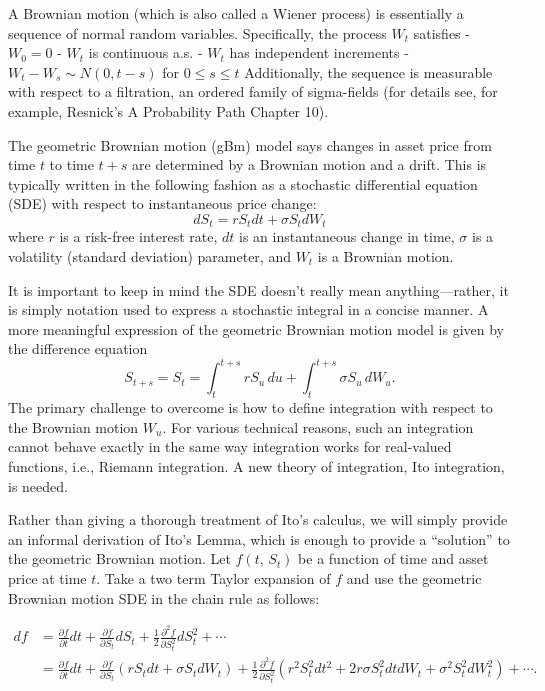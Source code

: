 \documentclass[
]{book}
\begin{document}
A Brownian motion (which is also called a Wiener process) is essentially a sequence of normal random variables. Specifically, the process \(W_t\) satisfies
- \(W_0 = 0\)
- \(W_t\) is continuous a.s.
- \(W_t\) has independent increments
- \(W_t - W_s \sim N(0,t-s)\) for \(0\leq s\leq t\)
Additionally, the sequence is measurable with respect to a filtration, an ordered family of sigma-fields (for details see, for example, Resnick's A Probability Path Chapter 10).

The geometric Brownian motion (gBm) model says changes in asset price from time \(t\) to time \(t+s\) are determined by a Brownian motion and a drift. This is typically written in the following fashion as a stochastic differential equation (SDE) with respect to instantaneous price change:
\[dS_t = rS_tdt + \sigma S_t dW_t\]
where \(r\) is a risk-free interest rate, \(dt\) is an instantaneous change in time, \(\sigma\) is a volatility (standard deviation) parameter, and \(W_t\) is a Brownian motion.

It is important to keep in mind the SDE doesn't really mean anything---rather, it is simply notation used to express a stochastic integral in a concise manner. A more meaningful expression of the geometric Brownian motion model is given by the difference equation
\[S_{t+s} = S_t = \int_t^{t+s} rS_u\,du + \int_{t}^{t+s} \sigma S_u \, dW_u.\]
The primary challenge to overcome is how to define integration with respect to the Brownian motion \(W_u\). For various technical reasons, such an integration cannot behave exactly in the same way integration works for real-valued functions, i.e., Riemann integration. A new theory of integration, Ito integration, is needed.

Rather than giving a thorough treatment of Ito's calculus, we will simply provide an informal derivation of Ito's Lemma, which is enough to provide a ``solution'' to the geometric Brownian motion. Let \(f(t,\,S_t)\) be a function of time and asset price at time \(t\). Take a two term Taylor expansion of \(f\) and use the geometric Brownian motion SDE in the chain rule as follows:

\begin{align*}
df &= \frac{\partial f}{\partial t}dt + \frac{\partial f}{\partial S_t}dS_t + \frac{1}{2}\frac{\partial^2 f}{\partial S_t^2}dS_t^2 + \cdots\\
& = \frac{\partial f}{\partial t}dt + \frac{\partial f}{\partial S_t}(rS_tdt + \sigma S_t dW_t) + \frac{1}{2}\frac{\partial^2 f}{\partial S_t^2}(r^2S_t^2dt^2 + 2r\sigma S_t^2 dtdW_t + \sigma^2S_t^2dW_t^2) + \cdots.
\end{align*}
\end{document}

